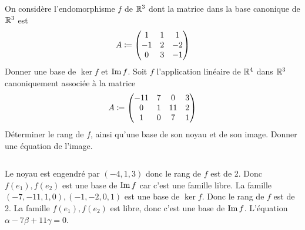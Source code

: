 \documentclass{magnolia}
\begin{document}

\begin{questions}
\question On considère l'endomorphisme $f$ de $\mathbb{R}^3$ dont la matrice dans la
  base canonique de $\mathbb{R}^3$ est
  \[A\coloneqq\begin{pmatrix}
      1 & 1 & 1\\
     -1 & 2 & -2\\
      0 & 3 & -1
      \end{pmatrix}\]
  Donner une base de $\ker f$ et $\operatorname{Im} f$.
\question Soit $f$ l'application linéaire de $\mathbb{R}^4$ dans $\mathbb{R}^3$ canoniquement
  associée à la matrice
  \[A\coloneqq\begin{pmatrix}
      -11 & 7 & 0 & 3\\
       0 & 1 & 11 & 2\\
       1 & 0 & 7 & 1
      \end{pmatrix}\]
  Déterminer le rang de $f$, ainsi qu'une base de son noyau et de son image.
  Donner une équation de l'image.
\end{questions}
\begin{sol}
$\quad$
\begin{questions}
\question Le noyau est engendré par $(-4,1,3)$ donc le rang de $f$ est de 2.
  Donc $f(e_1),f(e_2)$ est une base de $\operatorname{Im} f$ car c'est une famille libre.
\question La famille $(-7,-11,1,0),(-1,-2,0,1)$ est une base de $\ker f$.
  Donc le rang de $f$ est de 2. La famille $f(e_1),f(e_2)$ est libre, donc
  c'est une base de $\operatorname{Im} f$. L'équation $\alpha-7\beta+11\gamma=0$.  
\end{questions}
\end{sol}
\end{document}
